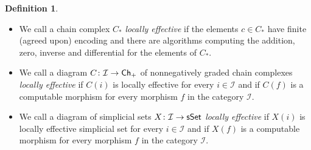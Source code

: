 \documentclass[12pt,a4wide]{article}
\theoremstyle{plain}
\theoremstyle{definition}
\newtheorem{Def}[thm]{Definition}
\newcommand{\Engen}{WK(\pi,\then)}
\newcommand{\Kpin}{K(\pi,\then)}
\newcommand{\then}{n}
\newcommand{\thedim}{{n}}
\newcommand{\thedimm}{{k}}
\renewcommand\:{\colon}
\newcommand{\dX}{X}
\newcommand{\dpi}{\pi}
\newcommand{\dK}{K}
\newcommand{\dC}{{C}}
\newcommand{\icat}{\mathcal I}
\begin{document}






\begin{Def}\label{def:pointw-effective}
\begin{itemize}
\item We call a chain complex $C_*$ \emph{locally effective} if the elements $c\in C_*$ have finite (agreed upon) encoding and there are algorithms computing the addition, zero, inverse and differential for the elements of $C_*$. 

\item We call a diagram $\dC \colon\icat \to \Ch_+$ of nonnegatively graded chain complexes \emph{locally effective} if $\dC (i)$ is locally effective for every $i \in \icat$ and if $\dC(f)$ is a computable morphism for every morphism $f$ in the category $\icat$.

\item We call a diagram of simplicial sets $\dX \: \icat \to \sSet$ \emph{locally effective} if $\dX (i)$ is locally effective simplicial set for every $i \in \icat$ and if $\dX(f)$ is a computable morphism for every morphism $f$ in the category $\icat$.
\end{itemize}
\end{Def}
\end{document}
